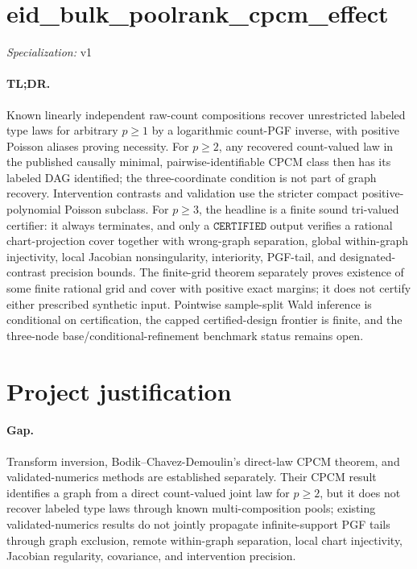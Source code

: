 \documentclass{article}
\begin{document}
\sloppy

\section*{eid\_\allowbreak{}bulk\_\allowbreak{}poolrank\_\allowbreak{}cpcm\_\allowbreak{}effect}

\noindent\textit{Specialization:} v1\par

\paragraph{TL;DR.} Known linearly independent raw-count compositions recover unrestricted labeled type laws for arbitrary \(p\geq1\) by a logarithmic count-PGF inverse, with positive Poisson aliases proving necessity. For \(p\geq2\), any recovered count-valued law in the published causally minimal, pairwise-identifiable CPCM class then has its labeled DAG identified; the three-coordinate condition is not part of graph recovery. Intervention contrasts and validation use the stricter compact positive-polynomial Poisson subclass. For \(p\geq3\), the headline is a finite sound tri-valued certifier: it always terminates, and only a \(\mathtt{CERTIFIED}\) output verifies a rational chart-projection cover together with wrong-graph separation, global within-graph injectivity, local Jacobian nonsingularity, interiority, PGF-tail, and designated-contrast precision bounds. The finite-grid theorem separately proves existence of some finite rational grid and cover with positive exact margins; it does not certify either prescribed synthetic input. Pointwise sample-split Wald inference is conditional on certification, the capped certified-design frontier is finite, and the three-node base/conditional-refinement benchmark status remains open.

\section{Project justification}

\paragraph{Gap.} Transform inversion, Bodik--Chavez-Demoulin's direct-law CPCM theorem, and validated-numerics methods are established separately. Their CPCM result identifies a graph from a direct count-valued joint law for \(p\geq2\), but it does not recover labeled type laws through known multi-composition pools; existing validated-numerics results do not jointly propagate infinite-support PGF tails through graph exclusion, remote within-graph separation, local chart injectivity, Jacobian regularity, covariance, and intervention precision.
\end{document}
